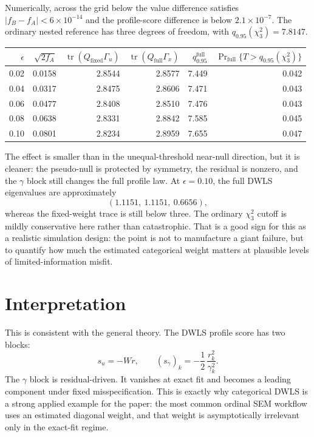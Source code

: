 \documentclass[11pt]{article}
\newcommand{\tr}{\operatorname{tr}}
\begin{document}
Numerically, across the grid below the value difference satisfies
\(|f_B-f_A|<6\times10^{-14}\) and the profile-score difference is below
\(2.1\times10^{-7}\). The ordinary nested reference has three degrees of
freedom, with \(q_{0.95}(\chi^2_3)=7.8147\).

\begin{center}
\begin{tabular}{rrrrrr}
\toprule
$\epsilon$ & $\sqrt{2f_A}$ &
$\tr(Q_{\mathrm{fixed}}\Gamma_u)$ &
$\tr(Q_{\mathrm{full}}\Gamma_x)$ &
$q^{\mathrm{full}}_{0.95}$ &
$\Pr_{\mathrm{full}}\{T>q_{0.95}(\chi^2_3)\}$ \\
\midrule
0.02 & 0.0158 & 2.8544 & 2.8577 & 7.449 & 0.042\\
0.04 & 0.0317 & 2.8475 & 2.8606 & 7.471 & 0.043\\
0.06 & 0.0477 & 2.8408 & 2.8510 & 7.476 & 0.043\\
0.08 & 0.0638 & 2.8331 & 2.8842 & 7.585 & 0.045\\
0.10 & 0.0801 & 2.8234 & 2.8959 & 7.655 & 0.047\\
\bottomrule
\end{tabular}
\end{center}

The effect is smaller than in the unequal-threshold near-null direction, but it
is cleaner: the pseudo-null is protected by symmetry, the residual is nonzero,
and the $\gamma$ block still changes the full profile law. At
$\epsilon=0.10$, the full DWLS eigenvalues are approximately
\[
  (1.1151,\ 1.1151,\ 0.6656),
\]
whereas the fixed-weight trace is still below three. The ordinary
\(\chi^2_3\) cutoff is mildly conservative here rather than catastrophic. That
is a good sign for this as a realistic simulation design: the point is not to
manufacture a giant failure, but to quantify how much the estimated categorical
weight matters at plausible levels of limited-information misfit.

\section{Interpretation}

This is consistent with the general theory. The DWLS profile score has two
blocks:
\[
  s_u=-Wr,
  \qquad
  (s_\gamma)_k=-\frac12\,\frac{r_k^2}{\gamma_k^2}.
\]
The $\gamma$ block is residual-driven. It vanishes at exact fit and becomes a
leading component under fixed misspecification. This is exactly why categorical
DWLS is a strong applied example for the paper: the most common ordinal SEM
workflow uses an estimated diagonal weight, and that weight is asymptotically
irrelevant only in the exact-fit regime.
\end{document}
